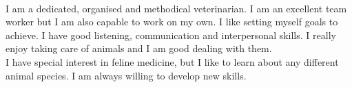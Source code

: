 \documentclass[a4paper,hidelinks]{catclinic_template}
\begin{document}
  \begin{cvSidebar}

    \begin{cvProfile}
    	\\[5pt]
      {
      \justifying%
       I am a dedicated, organised and methodical veterinarian. I am an excellent team worker but I am also capable to work on my own. I like setting myself goals to achieve. I have good listening, communication and interpersonal skills. I really enjoy taking care of animals and I am good dealing with them. \\

       I have special interest in feline medicine, but I like to learn about any different animal species. I am always willing to develop new skills.
       }
    	\\[5pt]
    \end{cvProfile}

    \begin{cvContact}
    \end{cvContact}

    \begin{cvLanguages}
    \\[3pt]
    \\[1pt]
    \end{cvLanguages}

    \begin{cvInterests}[short]
      \\[5pt]



    \end{cvInterests}


  \end{cvSidebar}
\end{document}
